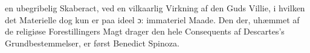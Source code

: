 \documentclass[12pt,a4paper]{book}
\newcommand{\gk}[1]{\textit{#1}}
\begin{document}
%
en ubegribelig Skaberact, ved en vilkaarlig Virkning af den
Guds Villie, i hvilken det Materielle dog kun er paa ideel
ɔ: immateriel Maade. Den der, uhæmmet af de religiøse
Forestillingers Magt drager den hele Consequents af Descartes's
Grundbestemmelser, er først Benedict Spinoza.
\end{document}
